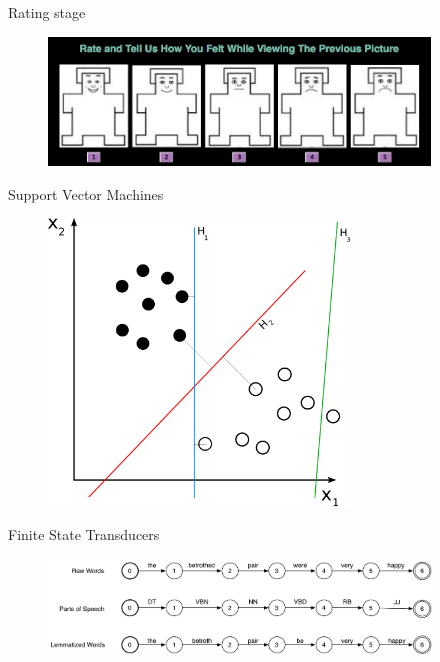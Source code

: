 \documentclass{beamer}
\begin{document}
\begin{frame}{Rating stage}
	\begin{figure}[htbp]
		\centering
			\includegraphics[height=1.35in]{figures/rating.png}
		\label{fig:figures_rating}
	\end{figure}	
\end{frame}

\begin{frame}{Support Vector Machines}
	\begin{figure}[htbp]
		\centering
			\includegraphics[height=3in]{figures/svm.png}
		\label{fig:figures_svm}
	\end{figure}
\end{frame}

\begin{frame}{Finite State Transducers}
	\begin{figure}[htbp]
		\centering
			\includegraphics[width=4in]{figures/words-pos-lemmas.pdf}
		\label{fig:figures_words-pos-lemmas}
	\end{figure}
\end{frame}
\end{document}
